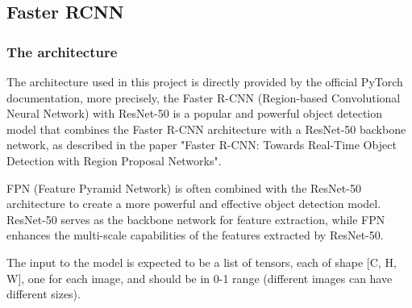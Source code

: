 \subsection{Faster RCNN}
\subsubsection{The architecture}
The architecture used in this project is directly provided by the official PyTorch documentation, more precisely, the Faster R-CNN (Region-based Convolutional Neural Network) with ResNet-50 is a popular and powerful object detection model that combines the Faster R-CNN architecture with a ResNet-50 backbone network, as described in the paper "Faster R-CNN: Towards Real-Time Object Detection with Region Proposal Networks"\cite{faster}.

FPN (Feature Pyramid Network) is often combined with the ResNet-50 architecture to create a more powerful and effective object detection model. ResNet-50 serves as the backbone network for feature extraction, while FPN enhances the multi-scale capabilities of the features extracted by ResNet-50.

The input to the model is expected to be a list of tensors, each of shape [C, H, W], one for each image, and should be in 0-1 range (different images can have different sizes). 

